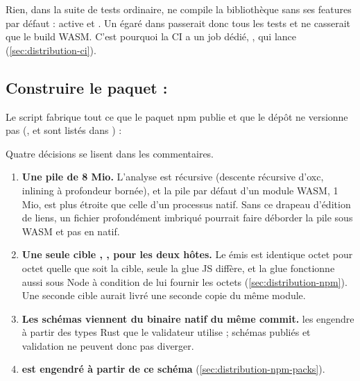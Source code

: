 \begin{piege}
Rien, dans la suite de tests ordinaire, ne compile la bibliothèque sans ses features par défaut :  active  et . Un  égaré dans  passerait donc tous les tests et ne casserait que le build WASM. C'est pourquoi la CI a un job dédié, , qui lance  (\cref{sec:distribution-ci}).
\end{piege}

\subsection{Construire le paquet : }

Le script  fabrique tout ce que le paquet npm publie et que le dépôt ne versionne pas (,  et  sont listés dans ) :


Quatre décisions se lisent dans les commentaires.
\begin{enumerate}
  \item \textbf{Une pile de 8 Mio.} L'analyse est récursive (descente récursive d'oxc, inlining à profondeur bornée), et la pile par défaut d'un module WASM, 1 Mio, est plus étroite que celle d'un processus natif. Sans ce drapeau d'édition de liens, un fichier profondément imbriqué pourrait faire déborder la pile sous WASM et pas en natif.
  \item \textbf{Une seule cible , , pour les deux hôtes.} Le  émis est identique octet pour octet quelle que soit la cible, seule la glue JS diffère, et la glue  fonctionne aussi sous Node à condition de lui fournir les octets (\cref{sec:distribution-npm}). Une seconde cible aurait livré une seconde copie du même module.
  \item \textbf{Les schémas viennent du binaire natif du même commit.}  les engendre à partir des types Rust que le validateur utilise ; schémas publiés et validation ne peuvent donc pas diverger.
  \item \textbf{ est engendré à partir de ce schéma} (\cref{sec:distribution-npm-packs}).
\end{enumerate}

